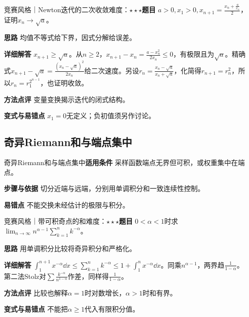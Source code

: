 \begin{example}{竞赛风格｜Newton迭代的二次收敛}{难度：$\star\star\star$}\label{deep:ex:limits_source_deep:newton}\textbf{题目} $a>0,x_1>0,x_{n+1}=\frac{x_n+\frac{a}{x_n}}{2}$，证明$x_n\to\sqrt a$。\par\textbf{思路} 均值不等式给下界，因式分解给误差。\par\textbf{详细解答} $x_{n+1}\ge\sqrt a$。从$n\ge2$，$x_{n+1}-x_n=\frac{a-x_n^2}{2x_n}\le0$，有极限且为$\sqrt a$。精确式$x_{n+1}-\sqrt a=\frac{(x_n-\sqrt a)^2}{2x_n}$给二次速度。另设$r_n=\frac{x_n-\sqrt a}{x_n+\sqrt a}$，化简得$r_{n+1}=r_n^2$，所以$r_n=r_1^{2^{n-1}}$，也证明收敛。\par\textbf{方法点评} 变量变换揭示迭代的闭式结构。\par\textbf{变式与易错点} $x_1=0$无定义；负初值须另作讨论。\end{example}

\subsection{奇异Riemann和与端点集中}\label{deep:limits_source_deep:integral}

\begin{method}{奇异Riemann和与端点集中}\textbf{适用条件} 采样函数端点无界但可积，或权重集中在端点。\par\textbf{步骤与依据} 切分近端与远端，分别用单调积分和一致连续性控制。\par\textbf{易错点} 不能交换未经估计的极限与积分。\end{method}

\begin{example}{竞赛风格｜带可积奇点的和}{难度：$\star\star\star$}\label{deep:ex:limits_source_deep:singular}\textbf{题目} $0<\alpha<1$时求$\lim_{n\to\infty}n^{\alpha-1}\sum_{k=1}^nk^{-\alpha}$。\par\textbf{思路} 用单调积分比较将奇异积分和严格化。\par\textbf{详细解答} $\int_1^{n+1}x^{-\alpha}\dd x\le\sum_{k=1}^nk^{-\alpha}\le1+\int_1^nx^{-\alpha}\dd x$。同乘$n^{\alpha-1}$，两界趋$\frac{1}{1-\alpha}$。第二法Stolz对$\sum \frac{k^{-\alpha}}{n^{1-\alpha}}$作差，同样得$\frac{1}{1-\alpha}$。\par\textbf{方法点评} 比较也解释$\alpha=1$时对数增长，$\alpha>1$时和有界。\par\textbf{变式与易错点} 不能把$\alpha\ge1$代入有限积分值。\end{example}

